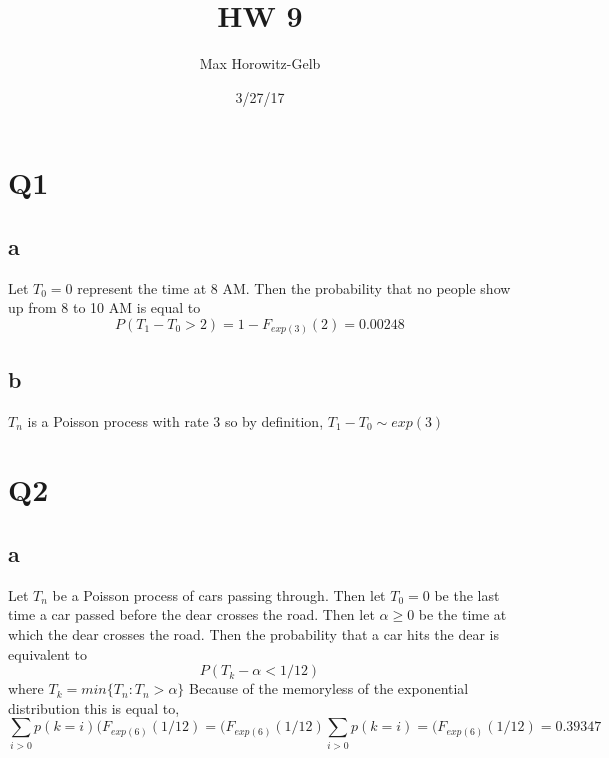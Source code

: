\documentclass{article}
\title{HW 9}
\date{3/27/17}
\author{Max Horowitz-Gelb}
\begin{document}
\maketitle
\section*{Q1}
\subsection*{a}
Let $T_0 = 0$ represent the time at 8 AM. Then the probability that no people show up from 8 to 10 AM is equal to 
$$
P(T_1-T_0 > 2) = 1 - F_{exp(3)}(2) = 0.00248
$$ 

\subsection*{b}
$T_n$ is a Poisson process with rate 3 so by definition, $T_1 - T_0 \sim exp(3)$

\section*{Q2}
\subsection*{a}
Let $T_n$ be a Poisson process of cars passing through. Then let $T_0 = 0$ be the last time a car passed before the dear crosses the road. Then let $\alpha \geq 0$ be the time at which the dear crosses the road.
Then the probability that a car hits the dear is equivalent to 
$$
P(T_{k} - \alpha < 1/12)
$$ where $T_k = min\{T_n : T_n > \alpha\}$
Because of the memoryless of the exponential distribution this is equal to, 
$$
\sum_{i > 0} p(k = i)(F_{exp(6)}(1/12) = (F_{exp(6)}(1/12) \sum_{i > 0} p(k = i) = (F_{exp(6)}(1/12) = 0.39347
$$
\end{document}
